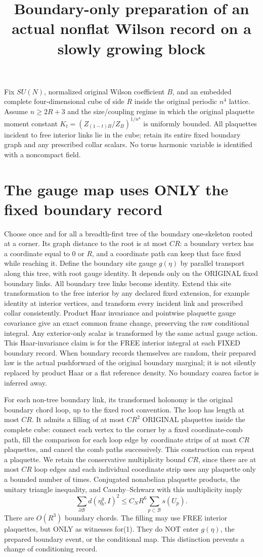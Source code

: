 \documentclass{article}
\title{Boundary-only preparation of an actual nonflat Wilson record on a slowly growing block}\author{}\date{}
\begin{document}
\maketitle
Fix $SU(N)$, normalized original Wilson coefficient $B$, and an embedded complete four-dimensional cube of side $R$ inside the original periodic $n^4$ lattice. Assume $n\ge2R+3$ and the size/coupling regime in which the original plaquette moment constant $K_t=(Z_{(1-t)B}/Z_B)^{1/n^4}$ is uniformly bounded. All plaquettes incident to free interior links lie in the cube; retain its entire fixed boundary graph and any prescribed collar scalars. No torus harmonic variable is identified with a noncompact field.

\section*{The gauge map uses ONLY the fixed boundary record}
Choose once and for all a breadth-first tree of the boundary one-skeleton rooted at a corner. Its graph distance to the root is at most $C R$: a boundary vertex has a coordinate equal to $0$ or $R$, and a coordinate path can keep that face fixed while reaching it. Define the boundary site gauge $g(\eta)$ by parallel transport along this tree, with root gauge identity. It depends only on the ORIGINAL fixed boundary links. All boundary tree links become identity. Extend this site transformation to the free interior by any declared fixed extension, for example identity at interior vertices, and transform every incident link and prescribed collar consistently. Product Haar invariance and pointwise plaquette gauge covariance give an exact common frame change, preserving the raw conditional integral. Any exterior-only scalar is transformed by the same actual gauge action. This Haar-invariance claim is for the FREE interior integral at each FIXED boundary record. When boundary records themselves are random, their prepared law is the actual pushforward of the original boundary marginal; it is not silently replaced by product Haar or a flat reference density. No boundary coarea factor is inferred away.

For each non-tree boundary link, its transformed holonomy is the original boundary chord loop, up to the fixed root convention. The loop has length at most $CR$. It admits a filling of at most $CR^2$ ORIGINAL plaquettes inside the complete cube: connect each vertex to the corner by a fixed coordinate-comb path, fill the comparison for each loop edge by coordinate strips of at most $CR$ plaquettes, and cancel the comb paths successively. This construction can repeat a plaquette. We retain the conservative multiplicity bound $CR$, since there are at most $CR$ loop edges and each individual coordinate strip uses any plaquette only a bounded number of times. Conjugated nonabelian plaquette products, the unitary triangle inequality, and Cauchy--Schwarz with this multiplicity imply
\[
 \sum_{\partial\mathcal B}d(\eta_b^{g},I)^2
 \le C_N R^6\sum_{p\subset\mathcal B}s(U_p).            \tag{1}
\]
There are $O(R^3)$ boundary chords. The filling may use FREE interior plaquettes, but ONLY as witnesses for(1). They do NOT enter $g(\eta)$, the prepared boundary event, or the conditional map. This distinction prevents a change of conditioning record.
\end{document}
